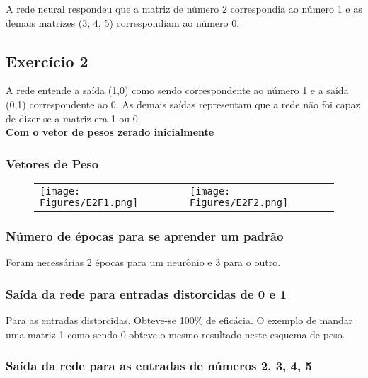 \documentclass[hidelinks,12pt]{article}
\begin{document}
		A rede neural respondeu que a matriz de número 2 correspondia ao número 1 e as demais matrizes (3, 4, 5) correspondiam ao número 0.
	
	

	\subsection{Exercício 2}
	
		A rede entende a saída (1,0) como sendo correspondente ao número 1 e a saída (0,1) correspondente ao 0. As demais saídas representam que a rede não foi capaz de dizer se a matriz era 1 ou 0.\\
		
		\textbf{\large Com o vetor de pesos zerado inicialmente}
		\subsubsection{Vetores de Peso}
		
		\begin{figure}[!h]
			\centering
			
		\begin{tabular}{ll}
			\texttt{[image: Figures/E2F1.png]}
			&
			\texttt{[image: Figures/E2F2.png]}
		\end{tabular}
			
		\end{figure}
		
		\subsubsection{Número de épocas para se aprender um padrão}
			
			Foram necessárias 2 épocas para um neurônio e 3 para o outro.
		
		\subsubsection{Saída da rede para entradas distorcidas de 0 e 1}
		
			Para as entradas distorcidas. Obteve-se 100\% de eficácia.
			O exemplo de mandar uma matriz 1 como sendo 0 obteve o mesmo resultado neste esquema de peso.
		
		\subsubsection{Saída da rede para as entradas de números 2, 3, 4, 5}
		
\end{document}
